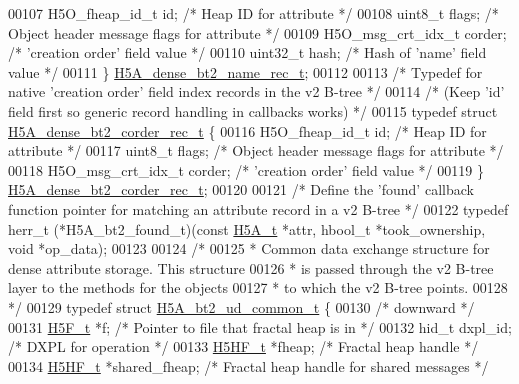 \begin{DoxyCode}
00107     H5O\_fheap\_id\_t id;                  \textcolor{comment}{/* Heap ID for attribute */}
00108     uint8\_t flags;                      \textcolor{comment}{/* Object header message flags for attribute */}
00109     H5O\_msg\_crt\_idx\_t corder;           \textcolor{comment}{/* 'creation order' field value */}
00110     uint32\_t hash;                      \textcolor{comment}{/* Hash of 'name' field value */}
00111 \} \hyperlink{struct_h5_a__dense__bt2__name__rec__t}{H5A\_dense\_bt2\_name\_rec\_t};
00112 
00113 \textcolor{comment}{/* Typedef for native 'creation order' field index records in the v2 B-tree */}
00114 \textcolor{comment}{/* (Keep 'id' field first so generic record handling in callbacks works) */}
00115 \textcolor{keyword}{typedef} \textcolor{keyword}{struct }\hyperlink{struct_h5_a__dense__bt2__corder__rec__t}{H5A\_dense\_bt2\_corder\_rec\_t} \{
00116     H5O\_fheap\_id\_t id;                  \textcolor{comment}{/* Heap ID for attribute */}
00117     uint8\_t flags;                      \textcolor{comment}{/* Object header message flags for attribute */}
00118     H5O\_msg\_crt\_idx\_t corder;           \textcolor{comment}{/* 'creation order' field value */}
00119 \} \hyperlink{struct_h5_a__dense__bt2__corder__rec__t}{H5A\_dense\_bt2\_corder\_rec\_t};
00120 
00121 \textcolor{comment}{/* Define the 'found' callback function pointer for matching an attribute record in a v2 B-tree */}
00122 \textcolor{keyword}{typedef} herr\_t (*H5A\_bt2\_found\_t)(\textcolor{keyword}{const} \hyperlink{struct_h5_a__t}{H5A\_t} *attr, hbool\_t *took\_ownership, \textcolor{keywordtype}{void} *op\_data);
00123 
00124 \textcolor{comment}{/*}
00125 \textcolor{comment}{ * Common data exchange structure for dense attribute storage.  This structure}
00126 \textcolor{comment}{ * is passed through the v2 B-tree layer to the methods for the objects}
00127 \textcolor{comment}{ * to which the v2 B-tree points.}
00128 \textcolor{comment}{ */}
00129 \textcolor{keyword}{typedef} \textcolor{keyword}{struct }\hyperlink{struct_h5_a__bt2__ud__common__t}{H5A\_bt2\_ud\_common\_t} \{
00130     \textcolor{comment}{/* downward */}
00131     \hyperlink{struct_h5_f__t}{H5F\_t}       *f;                     \textcolor{comment}{/* Pointer to file that fractal heap is in */}
00132     hid\_t       dxpl\_id;                \textcolor{comment}{/* DXPL for operation                */}
00133     \hyperlink{struct_h5_h_f__t}{H5HF\_t}      *fheap;                 \textcolor{comment}{/* Fractal heap handle               */}
00134     \hyperlink{struct_h5_h_f__t}{H5HF\_t}      *shared\_fheap;          \textcolor{comment}{/* Fractal heap handle for shared messages */}

\end{DoxyCode}
